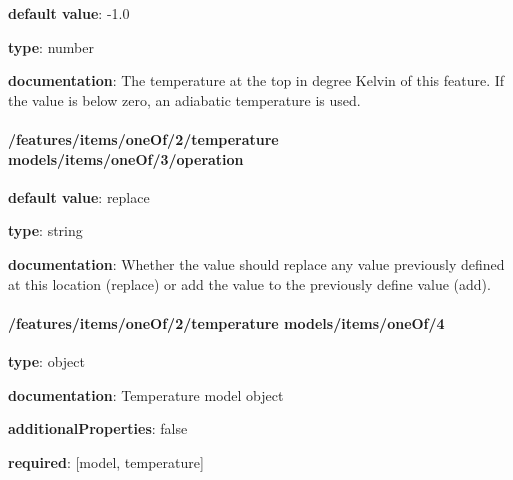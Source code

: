 \begin{itemized}
\item {\bf default value}: -1.0
\item {\bf type}: number
\item {\bf documentation}: The temperature at the top in degree Kelvin of this feature. If the value is below zero, an adiabatic temperature is used.
\end{itemized}\paragraph{/features/items/oneOf/2/temperature models/items/oneOf/3/operation} \begin{itemized}
\item {\bf default value}: replace
\item {\bf type}: string
\item {\bf documentation}: Whether the value should replace any value previously defined at this location (replace) or add the value to the previously define value (add).
\end{itemized}\paragraph{/features/items/oneOf/2/temperature models/items/oneOf/4} \begin{itemized}
\item {\bf type}: object
\item {\bf documentation}: Temperature model object
\item {\bf additionalProperties}: false
\item {\bf required}: [model, temperature]\end{itemized}
